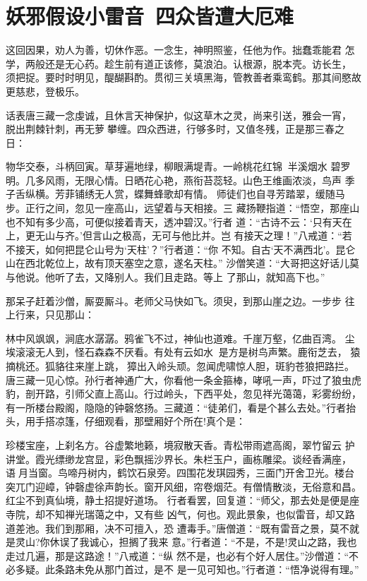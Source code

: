 \chapter{妖邪假设小雷音~四众皆遭大厄难}

这回因果，劝人为善，切休作恶。一念生，神明照鉴，任他为作。拙蠢乖能君
怎学，两般还是无心药。趁生前有道正该修，莫浪泊。认根源，脱本壳。访长生，
须把捉。要时时明见，醍醐斟酌。贯彻三关填黑海，管教善者乘鸾鹤。那其间愍故
更慈悲，登极乐。

话表唐三藏一念虔诚，且休言天神保护，似这草木之灵，尚来引送，雅会一宵，
脱出荆棘针刺，再无萝攀缠。四众西进，行够多时，又值冬残，正是那三春之日：

物华交泰，斗柄回寅。草芽遍地绿，柳眼满堤青。一岭桃花红锦，半溪烟水
碧罗明。几多风雨，无限心情。日晒花心艳，燕衔苔蕊轻。山色王维画浓淡，鸟声
季子舌纵横。芳菲铺绣无人赏，蝶舞蜂歌却有情。
师徒们也自寻芳踏翠，缓随马步。正行之间，忽见一座高山，远望着与天相接。三
藏扬鞭指道：“悟空，那座山也不知有多少高，可便似接着青天，透冲碧汉。”行者
道：“古诗不云：‘只有天在上，更无山与齐。’但言山之极高，无可与他比并。岂
有接天之理！”八戒道：“若不接天，如何把昆仑山号为‘天柱’？”行者道：“你
不知。自古‘天不满西北’。昆仑山在西北乾位上，故有顶天塞空之意，遂名天柱。”
沙僧笑道：“大哥把这好话儿莫与他说。他听了去，又降别人。我们且走路。等上
了那山，就知高下也。”

那呆子赶着沙僧，厮耍厮斗。老师父马快如飞。须臾，到那山崖之边。一步步
往上行来，只见那山：

林中风飒飒，涧底水潺潺。鸦雀飞不过，神仙也道难。千崖万壑，亿曲百湾。
尘埃滚滚无人到，怪石森森不厌看。有处有云如水，是方是树鸟声繁。鹿衔芝去，
猿摘桃还。狐貉往来崖上跳，獐出入岭头顽。忽闻虎啸惊人胆，斑豹苍狼把路拦。
唐三藏一见心惊。孙行者神通广大，你看他一条金箍棒，哮吼一声，吓过了狼虫虎
豹，剖开路，引师父直上高山。行过岭头，下西平处，忽见祥光蔼蔼，彩雾纷纷，
有一所楼台殿阁，隐隐的钟磬悠扬。三藏道：“徒弟们，看是个甚么去处。”行者抬
头，用手搭凉篷，仔细观看，那壁厢好个所在!真个是：

珍楼宝座，上刹名方。谷虚繁地籁，境寂散天香。青松带雨遮高阁，翠竹留云
护讲堂。霞光缥缈龙宫显，彩色飘摇沙界长。朱栏玉户，画栋雕梁。谈经香满座，
语月当窗。鸟啼丹树内，鹤饮石泉旁。四围花发琪园秀，三面门开舍卫光。楼台
突兀门迎嶂，钟磬虚徐声韵长。窗开风细，帘卷烟茫。有僧情散淡，无俗意和昌。
红尘不到真仙境，静土招提好道场。
行者看罢，回复道：“师父，那去处是便是座寺院，却不知禅光瑞蔼之中，又有些
凶气，何也。观此景象，也似雷音，却又路道差池。我们到那厢，决不可擅入，恐
遭毒手。”唐僧道：“既有雷音之景，莫不就是灵山?你休误了我诚心，担搁了我来
意。”行者道：“不是，不是!灵山之路，我也走过几遍，那是这路途！”八戒道：“纵
然不是，也必有个好人居住。”沙僧道：“不必多疑。此条路未免从那门首过，是不
是一见可知也。”行者道：“悟净说得有理。”


